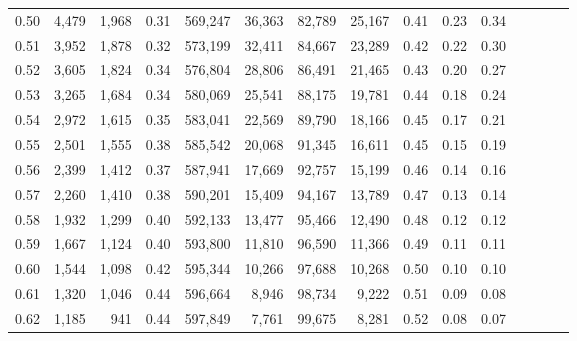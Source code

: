 \begin{tabular}{rrrcrrrrrrrrrrr}
0.50 &   4,479 &  1,968 &                                       0.31 &  569,247 &   36,363 &   82,789 &   25,167 &  0.41 &  0.23 &                         0.34 \\
0.51 &   3,952 &  1,878 &                                       0.32 &  573,199 &   32,411 &   84,667 &   23,289 &  0.42 &  0.22 &                         0.30 \\
0.52 &   3,605 &  1,824 &                                       0.34 &  576,804 &   28,806 &   86,491 &   21,465 &  0.43 &  0.20 &                         0.27 \\
0.53 &   3,265 &  1,684 &                                       0.34 &  580,069 &   25,541 &   88,175 &   19,781 &  0.44 &  0.18 &                         0.24 \\
0.54 &   2,972 &  1,615 &                                       0.35 &  583,041 &   22,569 &   89,790 &   18,166 &  0.45 &  0.17 &                         0.21 \\
0.55 &   2,501 &  1,555 &                                       0.38 &  585,542 &   20,068 &   91,345 &   16,611 &  0.45 &  0.15 &                         0.19 \\
0.56 &   2,399 &  1,412 &                                       0.37 &  587,941 &   17,669 &   92,757 &   15,199 &  0.46 &  0.14 &                         0.16 \\
0.57 &   2,260 &  1,410 &                                       0.38 &  590,201 &   15,409 &   94,167 &   13,789 &  0.47 &  0.13 &                         0.14 \\
0.58 &   1,932 &  1,299 &                                       0.40 &  592,133 &   13,477 &   95,466 &   12,490 &  0.48 &  0.12 &                         0.12 \\
0.59 &   1,667 &  1,124 &                                       0.40 &  593,800 &   11,810 &   96,590 &   11,366 &  0.49 &  0.11 &                         0.11 \\
0.60 &   1,544 &  1,098 &                                       0.42 &  595,344 &   10,266 &   97,688 &   10,268 &  0.50 &  0.10 &                         0.10 \\
0.61 &   1,320 &  1,046 &                                       0.44 &  596,664 &    8,946 &   98,734 &    9,222 &  0.51 &  0.09 &                         0.08 \\
0.62 &   1,185 &    941 &                                       0.44 &  597,849 &    7,761 &   99,675 &    8,281 &  0.52 &  0.08 &                         0.07 \\

\end{tabular}
